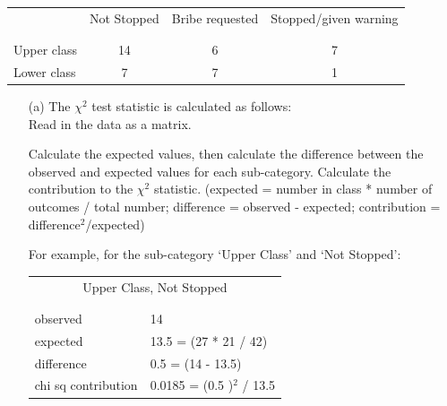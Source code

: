 \documentclass[12pt,letterpaper]{article}
\begin{document}
\newpage
\begin{table}[h!]
	\centering
	\begin{tabular}{l | c c c }
		& Not Stopped & Bribe requested & Stopped/given warning \\
		\\[-1.8ex] 
		\hline \\[-1.8ex]
		Upper class & 14 & 6 & 7 \\
		Lower class & 7 & 7 & 1 \\
		\hline
	\end{tabular}
\end{table}

\begin{enumerate}

	\item [(a)]
	The $\chi^2$ test statistic is calculated as follows:\\
	
	Read in the data as a matrix.
	  

	Calculate the expected values, then calculate the difference between the observed 
	and expected values for each sub-category.  Calculate the contribution to the 
	$\chi^2$ statistic. 
	(expected = number in class * number of outcomes / total number;
		difference = observed - expected; contribution = difference$^2$/expected) %
		
		For example, for the sub-category `Upper Class' and `Not Stopped':
	
	\begin{table}[htb]
		\centering
		\begin{tabular}{l | l}
			\multicolumn{2}{c}{Upper Class, Not Stopped} \\
			\\[-1.8ex] 
			\hline \\[-1.8ex]
			observed  &  14  \\
			expected  &  13.5 = (27 * 21 / 42)\\
			difference  &  0.5  = (14 - 13.5)\\
			chi sq contribution  &  0.0185  = (0.5 )$^2$ / 13.5\\
			
		\end{tabular}
	\end{table}
	
	  


\end{enumerate}
\end{document}
